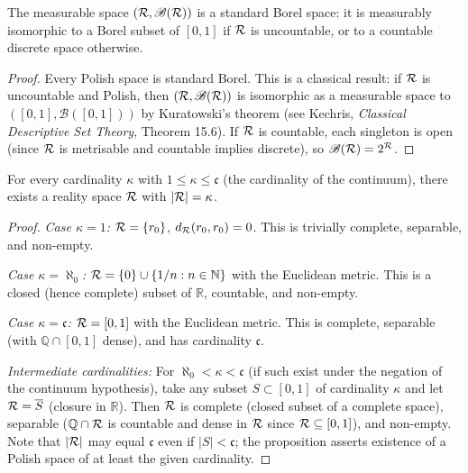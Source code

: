 \begin{lemma}
\label{lem:3.1}
The measurable space $(\mathcal{R}, \mathscr{B}(\mathcal{R}))$ is a standard Borel
space: it is measurably isomorphic to a Borel subset of $[0,1]$ if
$\mathcal{R}$ is uncountable, or to a countable discrete space otherwise.
\end{lemma}

\begin{proof}
Every Polish space is standard Borel.  This is a classical result: if
$\mathcal{R}$ is uncountable and Polish, then $(\mathcal{R}, \mathscr{B}(\mathcal{R}))$ is
isomorphic as a measurable space to $([0,1], \mathscr{B}([0,1]))$ by
Kuratowski's theorem (see Kechris, \textit{Classical Descriptive Set
Theory}, Theorem 15.6).  If $\mathcal{R}$ is countable, each singleton is open
(since $\mathcal{R}$ is metrisable and countable implies discrete), so
$\mathscr{B}(\mathcal{R}) = 2^{\mathcal{R}}$.
\end{proof}

\begin{proposition}
\label{prop:3.1}
For every cardinality $\kappa$ with $1 \leq \kappa \leq \mathfrak{c}$
(the cardinality of the continuum), there exists a reality space $\mathcal{R}$
with $|\mathcal{R}| = \kappa$.
\end{proposition}

\begin{proof}
\textit{Case $\kappa = 1$:} $\mathcal{R} = \{r_0\}$, $d_{\mathcal{R}}(r_0, r_0) = 0$.
This is trivially complete, separable, and non-empty.

\textit{Case $\kappa = \aleph_0$:} $\mathcal{R} = \{0\} \cup \{1/n : n \in
\mathbb{N}\}$ with the Euclidean metric.  This is a closed (hence
complete) subset of $\mathbb{R}$, countable, and non-empty.

\textit{Case $\kappa = \mathfrak{c}$:} $\mathcal{R} = [0,1]$ with the Euclidean
metric.  This is complete, separable (with $\mathbb{Q} \cap [0,1]$
dense), and has cardinality $\mathfrak{c}$.

\textit{Intermediate cardinalities:} For $\aleph_0 < \kappa <
\mathfrak{c}$ (if such exist under the negation of the continuum
hypothesis), take any subset $S \subset [0,1]$ of cardinality $\kappa$
and let $\mathcal{R} = \overline{S}$ (closure in $\mathbb{R}$).  Then $\mathcal{R}$ is
complete (closed subset of a complete space), separable ($\mathbb{Q}
\cap \mathcal{R}$ is countable and dense in $\mathcal{R}$ since $\mathcal{R} \subseteq [0,1]$),
and non-empty.  Note that $|\mathcal{R}|$ may equal $\mathfrak{c}$ even if
$|S| < \mathfrak{c}$; the proposition asserts existence of a Polish
space of at least the given cardinality.
\end{proof}

